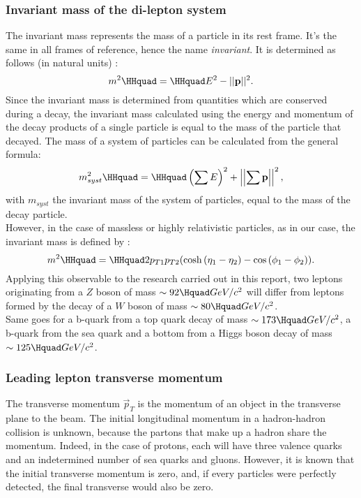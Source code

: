 \subsubsection*{Invariant mass of the di-lepton system}

The invariant mass represents the mass of a particle in its rest frame. It's the same in all frames of reference, hence the name \textit{invariant}. It is determined as follows (in natural units) :
\begin{equation}
    m^2 \HHquad = \HHquad E^2 - ||\textbf{p}||^2.
\end{equation}
Since the invariant mass is determined from quantities which are conserved during a decay, the invariant mass calculated using the energy and momentum of the decay products of a single particle is equal to the mass of the particle that decayed. The mass of a system of particles can be calculated from the general formula:
\begin{equation}
    m_{syst}^2 \HHquad = \HHquad \left(\sum E \right)^2 + \left| \left|\sum \textbf{p} \right| \right|^2,
\end{equation}
with $m_{syst}$ the invariant mass of the system of particles, equal to the mass of the decay particle.\\
However, in the case of massless or highly relativistic particles, as in our case, the invariant mass is defined by :
\begin{equation}
    m^2 \HHquad = \HHquad 2 p_{T1} p_{T2} (\cosh{(\eta_1 - \eta_2)} - \cos{(\phi_1 - \phi_2)}).
\end{equation}
Applying this observable to the research carried out in this report, two leptons originating from a $Z$ boson of mass $\sim 92 \Hquad GeV/c^2$ will differ from leptons formed by the decay of a $W$ boson of mass $\sim 80 \Hquad GeV/c^2$.\\
Same goes for a b-quark from a top quark decay of mass $\sim 173 \Hquad GeV/c^2$, a b-quark from the sea quark and a bottom from a Higgs boson decay of mass $\sim 125 \Hquad GeV/c^2$.\\

\subsubsection*{Leading lepton transverse momentum}

The transverse momentum $\Vec{p}_T$ is the momentum of an object in the transverse plane to the beam. The initial longitudinal momentum in a hadron-hadron collision is unknown, because the partons that make up a hadron share the momentum. Indeed, in the case of protons, each will have three valence quarks and an indetermined number of sea quarks and gluons. However, it is known that the initial transverse momentum is zero, and, if every particles were perfectly detected, the final transverse would also be zero.


